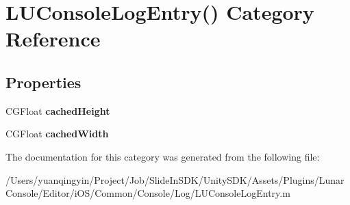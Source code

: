 \hypertarget{category_l_u_console_log_entry_07_08}{}\section{L\+U\+Console\+Log\+Entry() Category Reference}
\label{category_l_u_console_log_entry_07_08}
\subsection*{Properties}
\begin{DoxyCompactItemize}
\item 
\mbox{\label{category_l_u_console_log_entry_07_08_adfa0473cbf9f23b093cf643ade60998e}} 
C\+G\+Float {\bfseries cached\+Height}
\item 
\mbox{\label{category_l_u_console_log_entry_07_08_aff8fee709d20c6206c30f0bef8defc54}} 
C\+G\+Float {\bfseries cached\+Width}
\end{DoxyCompactItemize}


The documentation for this category was generated from the following file\+:\begin{DoxyCompactItemize}
\item 
/\+Users/yuanqingyin/\+Project/\+Job/\+Slide\+In\+S\+D\+K/\+Unity\+S\+D\+K/\+Assets/\+Plugins/\+Lunar\+Console/\+Editor/i\+O\+S/\+Common/\+Console/\+Log/L\+U\+Console\+Log\+Entry.\+m\end{DoxyCompactItemize}
